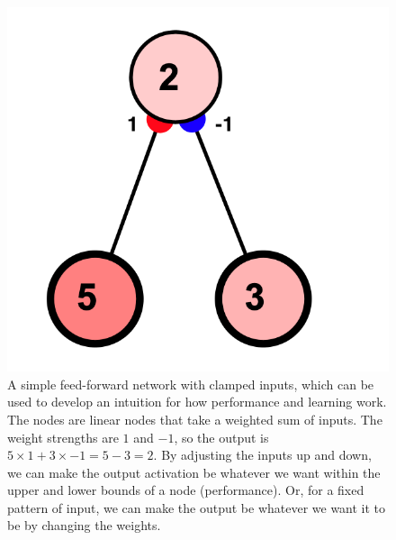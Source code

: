 \begin{figure}[h]
\centering
\includegraphics[scale=.5]{./images/2NodeSimpleFF.png}
\caption[Simbrain screenshot.]{A simple feed-forward network with clamped inputs, which can be used to develop an intuition for how performance and learning work. The nodes are linear nodes that take a weighted sum of inputs. The weight strengths are $1$ and $-1$, so the output is $5 \times 1 + 3 \times -1 = 5 - 3 = 2$. By adjusting the inputs up and down, we can make the output activation be whatever we want within the upper and lower bounds of a node (performance). Or, for a fixed pattern of input, we can make the output be whatever we want it to be by changing the weights.}
\label{2NodeSimpleFF}
\end{figure}

